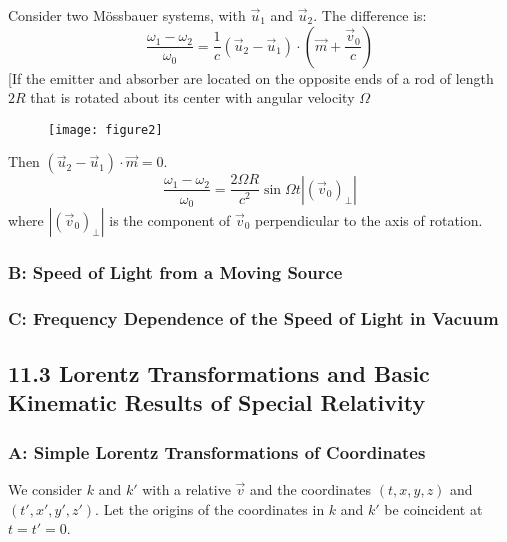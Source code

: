 \documentclass{article}
\begin{document}
	Consider two M\"{o}ssbauer systems, with $\vec{u}_1$ and $\vec{u}_2$. The difference is:
	\[ \frac{\omega_1 - \omega_2}{\omega_0} = \frac{1}{c} (\vec{u}_2 - \vec{u}_1) \cdot (\vec{m} + \frac{\vec{v}_0}{c}) \]
	[If the emitter and absorber are located on the opposite ends of a rod of length $2R$ that is rotated about its center with angular velocity $\Omega$ 
	
	\begin{figure}[h]
		\centering
		\texttt{[image: figure2]}
		\caption{}
		\label{fig:figure2}
	\end{figure}
	
	Then $(\vec{u}_2 - \vec{u}_1) \cdot \vec{m} = 0$.
	\[ \frac{\omega_1 - \omega_2}{\omega_0} = \frac{2\Omega R}{c^2} \sin \Omega t |(\vec{v}_0)_{\perp}| \]
	where $|(\vec{v}_0)_{\perp}|$ is the component of $\vec{v}_0$ perpendicular to the axis of rotation.
	
	\subsubsection*{B: Speed of Light from a Moving Source}
	\subsubsection*{C: Frequency Dependence of the Speed of Light in Vacuum}
	
	\subsection*{11.3 Lorentz Transformations and Basic Kinematic Results of Special Relativity}
	\subsubsection*{A: Simple Lorentz Transformations of Coordinates}
	We consider $k$ and $k'$ with a relative $\vec{v}$ and the coordinates $(t, x, y, z)$ and $(t', x', y', z')$. Let the origins of the coordinates in $k$ and $k'$ be coincident at $t = t' = 0$.
	
\end{document}

